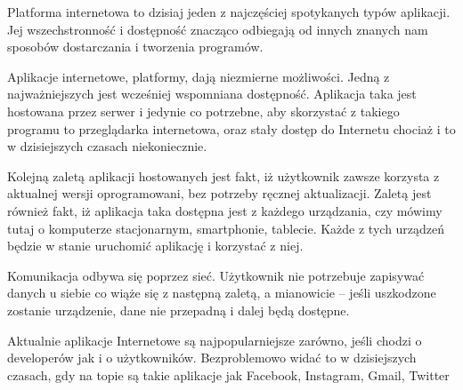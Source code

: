 Platforma internetowa to dzisiaj jeden z najczęściej spotykanych typów aplikacji. Jej wszechstronność i dostępność znacząco odbiegają od innych znanych nam sposobów dostarczania i tworzenia programów. 

Aplikacje internetowe, platformy, dają niezmierne możliwości. Jedną z najważniejszych jest wcześniej wspomniana dostępność. Aplikacja taka jest hostowana przez serwer i jedynie co potrzebne, aby skorzystać z takiego programu to przeglądarka internetowa, oraz stały dostęp do Internetu chociaż i to w dzisiejszych czasach niekoniecznie. 

Kolejną zaletą aplikacji hostowanych jest fakt, iż użytkownik zawsze korzysta z aktualnej wersji oprogramowani, bez potrzeby ręcznej aktualizacji. Zaletą jest również fakt, iż aplikacja taka dostępna jest z każdego urządzania, czy mówimy tutaj o komputerze stacjonarnym, smartphonie, tablecie. Każde z tych urządzeń będzie w stanie uruchomić aplikację i korzystać z niej. 

Komunikacja odbywa się poprzez sieć. Użytkownik nie potrzebuje zapisywać danych u siebie co wiąże się z następną zaletą, a mianowicie – jeśli uszkodzone zostanie urządzenie, dane nie przepadną i dalej będą dostępne. 

Aktualnie aplikacje Internetowe są najpopularniejsze zarówno, jeśli chodzi o developerów jak i o użytkowników. Bezproblemowo widać to w dzisiejszych czasach, gdy na topie są takie aplikacje jak Facebook, Instagram, Gmail, Twitter 
